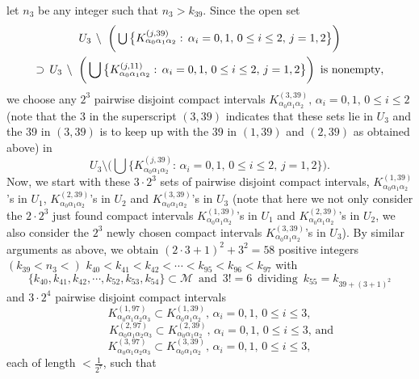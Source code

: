 \documentclass[12pt]{article}
\newcommand{\al}{\alpha}
\begin{document}
let $n_3$ be any integer such that $n_3 > k_{39}$.  Since the open set 
\begin{multline*}
$$
U_3 \, \setminus \ \bigg( \bigcup \big\{ K_{\al_0\al_1\al_2}^{(j,39)}: \, \al_i = 0, 1, \, 0 \le i \le 2, \, j = 1, 2 \big\} \bigg) \\
\supset \, U_3 \, \setminus \ \bigg( \bigcup \big\{ K_{\al_0\al_1\al_2}^{(j,11)}: \, \al_i = 0, 1, \, 0 \le i \le 2, \, j = 1, 2 \big\} \bigg) \,\,\, \text{is nonempty},
$$
\end{multline*}
we choose any $2^3$ pairwise disjoint compact intervals $K_{\al_0\al_1\al_2}^{(3,39)}, \, \al_i = 0, 1, \, 0 \le i \le 2$ \big(note that the 3 in the superscript $(3, 39)$ indicates that these sets lie in $U_3$ and the 39 in $(3, 39)$ is to keep up with the 39 in $(1, 39)$ and $(2, 39)$ as obtained above\big) in 
$$
U_3 \setminus \bigg( \bigcup \big\{ K_{\al_0\al_1\al_2}^{(j,39)}: \, \al_i = 0, 1, \, 0 \le i \le 2, \, j = 1, 2 \big\} \bigg).
$$ 
\indent Now, we start with these $3 \cdot 2^3$ sets of pairwise disjoint compact intervals, $K_{\al_0\al_1\al_2}^{(1,39)}$'s in $U_1$, $K_{\al_0\al_1\al_2}^{(2,39)}$'s in $U_2$ and $K_{\al_0\al_1\al_2}^{(3,39)}$'s in $U_3$ \big(note that here we not only consider the $2 \cdot 2^3$ just found compact intervals $K_{\al_0\al_1\al_2}^{(1,39)}$'s in $U_1$ and $K_{\al_0\al_1\al_2}^{(2,39)}$'s in $U_2$, we also consider the $2^3$ newly chosen compact intervals $K_{\al_0\al_1\al_2}^{(3,39)}$'s in $U_3$\big).  By similar arguments as above, we obtain $(2 \cdot 3+1)^2 + 3^2= 58$ positive integers $(k_{39} < n_3 <)$ $k_{40} < k_{41} < k_{42} < \cdots < k_{95} < k_{96} < k_{97}$ with 
$$
\{ k_{40}, k_{41}, k_{42}, \cdots, k_{52}, k_{53}, k_{54} \} \subset \mathcal M \,\,\, \text{and} \,\,\, 3! = 6 \,\,\, \text{dividing} \,\,\, k_{55} = k_{39+(3+1)^2}
$$
and $3 \cdot 2^4$ pairwise disjoint compact intervals 
$$
K_{\al_0\al_1\al_2\al_3}^{(1,97)} \subset K_{\al_0\al_1\al_2}^{(1,39)}, \, \al_i = 0, 1, \, 0 \le i \le 3,
$$
$$
\qquad K_{\al_0\al_1\al_2\al_3}^{(2,97)} \subset K_{\al_0\al_1\al_2}^{(2,39)}, \, \al_i = 0, 1, \, 0 \le i \le 3, \, \text{and}
$$
$$
K_{\al_0\al_1\al_2\al_3}^{(3,97)} \subset K_{\al_0\al_1\al_2}^{(3,39)}, \, \al_i = 0, 1, \, 0 \le i \le 3,
$$
each of length $< \frac 1{2^7}$, such that 
\end{document}
